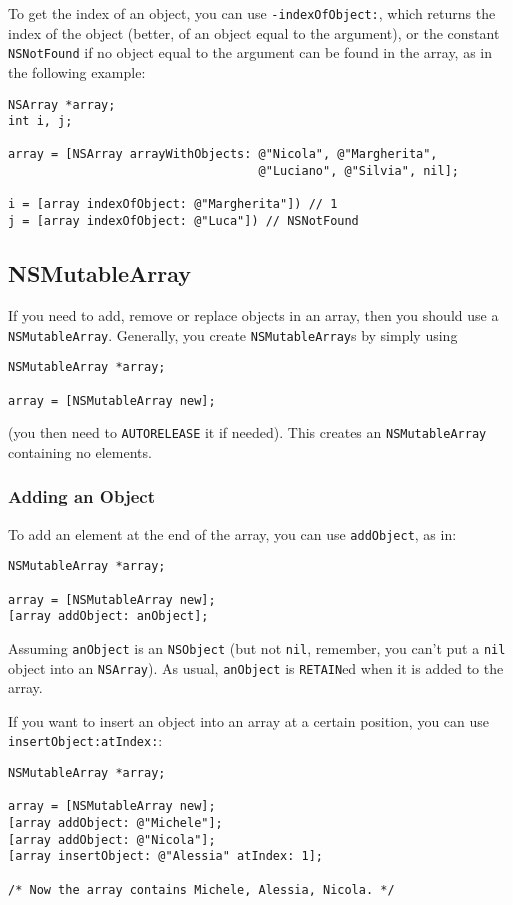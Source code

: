 \documentclass[a4paper]{article}
\begin{document}
To get the index of an object, you can use \texttt{-indexOfObject:},
which returns the index of the object (better, of an object equal to
the argument), or the constant \texttt{NSNotFound} if no object equal
to the argument can be found in the array, as in the following
example:
\begin{verbatim}
NSArray *array;
int i, j;

array = [NSArray arrayWithObjects: @"Nicola", @"Margherita",
                                   @"Luciano", @"Silvia", nil];

i = [array indexOfObject: @"Margherita"]) // 1
j = [array indexOfObject: @"Luca"]) // NSNotFound
\end{verbatim}

\subsection{NSMutableArray}
If you need to add, remove or replace objects in an array, then you
should use a \texttt{NSMutableArray}.  Generally, you create
\texttt{NSMutableArray}s by simply using 
\begin{verbatim}
NSMutableArray *array;

array = [NSMutableArray new];
\end{verbatim}
(you then need to \texttt{AUTORELEASE} it if needed).  
This creates an \texttt{NSMutableArray} containing no elements. 

\subsubsection{Adding an Object}
To add an element at the end of the array, you can use
\texttt{addObject}, as in:
\begin{verbatim}
NSMutableArray *array;

array = [NSMutableArray new];
[array addObject: anObject];
\end{verbatim}

Assuming \texttt{anObject} is an \texttt{NSObject} (but not
\texttt{nil}, remember, you can't put a \texttt{nil} object into an
\texttt{NSArray}).  As usual, \texttt{anObject} is \texttt{RETAIN}ed 
when it is added to the array.

If you want to insert an object into an array at a certain position, 
you can use \texttt{insertObject:atIndex:}:
\begin{verbatim}
NSMutableArray *array;

array = [NSMutableArray new];
[array addObject: @"Michele"];
[array addObject: @"Nicola"];
[array insertObject: @"Alessia" atIndex: 1];

/* Now the array contains Michele, Alessia, Nicola. */
\end{verbatim}
\end{document}
